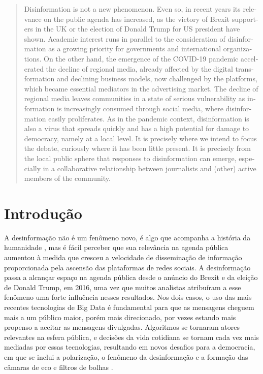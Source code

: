 \documentclass[portuguese]{textolivre}
\begin{document}
\begin{polyabstract}
\begin{english}
\begin{abstract}
Disinformation is not a new phenomenon. Even so, in recent years its relevance on the public agenda has increased, as the victory of Brexit supporters in the UK or the election of Donald Trump for US president have shown. Academic interest runs in parallel to the consideration of disinformation as a growing priority for governments and international organizations. On the other hand, the emergence of the COVID-19 pandemic accelerated the decline of regional media, already affected by the digital transformation and declining business models, now challenged by the platforms, which became essential mediators in the advertising market. The decline of regional media leaves communities in a state of serious vulnerability as information is increasingly consumed through social media, where disinformation easily proliferates. As in the pandemic context, disinformation is also a virus that spreads quickly and has a high potential for damage to democracy, namely at a local level. It is precisely where we intend to focus the debate, curiously where it has been little present. It is precisely from the local public sphere that responses to disinformation can emerge,  especially in a collaborative relationship between journalists and (other) active members of the community.

\end{abstract}
\end{english}
\end{polyabstract}

\section{Introdução}
A desinformação não é um fenômeno novo, é algo que acompanha a história da humanidade \cite{ireton2019}, mas é fácil perceber que sua relevância na agenda pública aumentou à medida que cresceu a velocidade de disseminação de informação proporcionada pela ascensão das plataformas de redes sociais. A desinformação passa a alcançar espaço na agenda pública desde o anúncio do Brexit e da eleição de Donald Trump, em 2016, uma vez que muitos analistas atribuíram a esse fenômeno uma forte influência nesses resultados. Nos dois casos, o uso das mais recentes tecnologias de Big Data é fundamental para que as mensagens cheguem mais a um público maior, porém mais direcionado, por vezes estando mais propenso a aceitar as mensagens divulgadas. Algoritmos se tornaram atores relevantes na esfera pública, e decisões da vida cotidiana se tornam cada vez mais mediadas por essas tecnologias, resultando em novos desafios para a democracia, em que se inclui a polarização, o fenômeno da desinformação e a formação das câmaras de eco e filtros de bolhas \cite{garcia-orosa_algorithms_2023}. 
\end{document}
